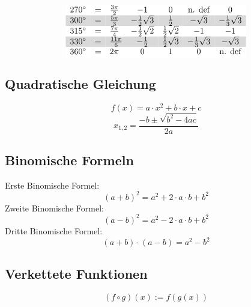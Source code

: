 \[{\begin{array}{rclcccc}
\rowcolor{white} 270^\circ&=&\frac{3\pi}{2}   &                     -1&                      0&          \text{n. def}&                      0\\
\rowcolor{lgray} 300^\circ&=&\frac{5\pi}{3}   &   -\frac{1}{2}\sqrt{3}&            \frac{1}{2}&              -\sqrt{3}&   -\frac{1}{3}\sqrt{3}\\
\rowcolor{white} 315^\circ&=&\frac{7\pi}{4}   &   -\frac{1}{2}\sqrt{2}&    \frac{1}{2}\sqrt{2}&                     -1&                     -1\\
\rowcolor{lgray} 330^\circ&=&\frac{11\pi}{6}  &           -\frac{1}{2}&    \frac{1}{2}\sqrt{3}&   -\frac{1}{3}\sqrt{3}&              -\sqrt{3}\\
\rowcolor{white} 360^\circ&=&2 \pi            &                      0&                      1&                      0&          \text{n. def}\\
\end{array}} \]


\subsection{Quadratische Gleichung}
\[ \boxed{f(x) = a \cdot x^2 + b \cdot x + c} \]
\[ \boxed{x_{1,2}=\frac{-b\pm\sqrt{b^2-4ac}}{2a}} \]

\subsection{Binomische Formeln}
Erste Binomische Formel: 
\[ \boxed{(a + b)^2 = a^2 + 2 \cdot a \cdot b + b^2} \]Zweite Binomische Formel: 
\[ \boxed{(a - b)^2 = a^2 - 2 \cdot a \cdot b + b^2} \]Dritte Binomische Formel: 
\[ \boxed{(a + b) \cdot (a - b) = a^2 - b^2} \]

\subsection{Verkettete Funktionen}
\[ \boxed{(f \circ g)(x) := f(g(x))} \]

